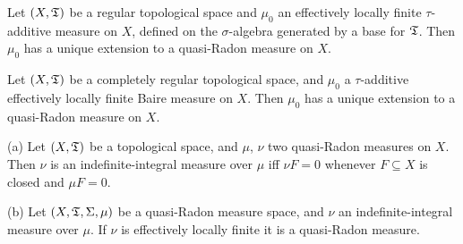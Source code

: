  Let $(X,\frak T)$ be a regular topological
space and $\mu_0$ an effectively locally finite $\tau$-additive measure
on $X$, defined on the $\sigma$-algebra generated by a base
for $\frak T$.   Then $\mu_0$ has a unique extension to a quasi-Radon
measure on $X$.


 Let $(X,\frak T)$ be a completely regular
topological space, and $\mu_0$ a $\tau$-additive effectively locally
finite Baire measure on $X$.   Then $\mu_0$ has a unique extension to a
quasi-Radon measure on $X$.


 (a) Let $(X,\frak T)$ be a topological space,
and $\mu$, $\nu$ two quasi-Radon measures on $X$.   Then $\nu$ is an
indefinite-integral measure over $\mu$ iff
$\nu F=0$ whenever $F\subseteq X$ is closed and $\mu F=0$.

(b) Let $(X,\frak T,\Sigma,\mu)$ be a
quasi-Radon measure space, and $\nu$ an indefinite-integral measure over
$\mu$.   If $\nu$ is effectively locally 
finite it is a quasi-Radon measure.

